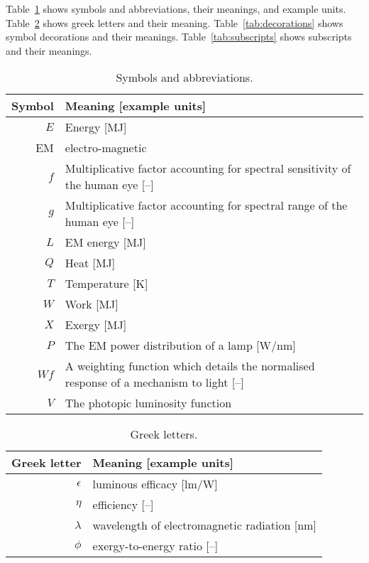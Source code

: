 
\noindent 
Table~\ref{tab:symbols} shows symbols and abbreviations, their meanings, and example units.
Table~\ref{tab:greek} shows greek letters and their meaning.
Table~\ref{tab:decorations} shows symbol decorations and their meanings.
Table~\ref{tab:subscripts} shows subscripts and their meanings.


  
\begin{table}
\centering %
\caption{Symbols and abbreviations.}
\begin{tabular}{r l}
\toprule
Symbol & Meaning [example units] \\
\midrule
$E$ & Energy [MJ] \\
EM & electro-magnetic \\
$f$ & Multiplicative factor accounting for spectral sensitivity of the human eye [--] \\
$g$ & Multiplicative factor accounting for spectral range of the human eye [--] \\
$L$ & EM energy [MJ] \\
$Q$ & Heat [MJ] \\
$T$ & Temperature [K] \\
$W$ & Work [MJ] \\
$X$ & Exergy [MJ] \\
$P$ & The EM power distribution of a lamp [W/nm] \\
$Wf$ & A weighting function which details the normalised response of a mechanism to light [--] \\
$V$ & The photopic luminosity function \\
\bottomrule
\end{tabular}
\label{tab:symbols}
\end{table}



\begin{table}
\centering %
\caption{Greek letters.}
\begin{tabular}{r l}
  \toprule
  Greek letter & Meaning [example units] \\
  \midrule
  $\epsilon$ & luminous efficacy [lm/W] \\
  $\eta$ & efficiency [--] \\
  $\lambda$ & wavelength of electromagnetic radiation [nm] \\
  $\phi$ & exergy-to-energy ratio [--] \\
  \bottomrule
\end{tabular}
\label{tab:greek}
\end{table}


